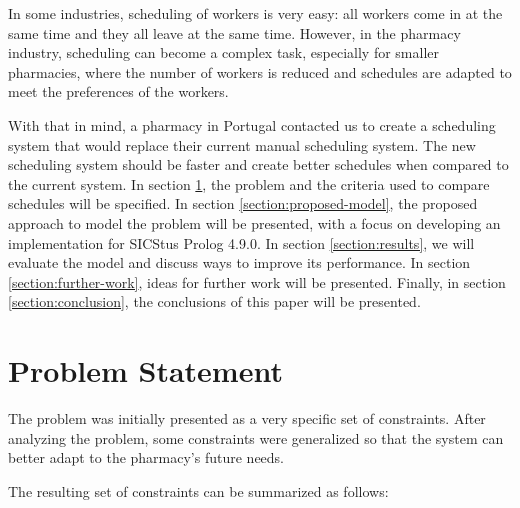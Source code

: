 \documentclass[conference]{IEEEtran}
\begin{document}
In some industries, scheduling of workers is very easy: all workers come in at the same time and they all leave at the same time.
However, in the pharmacy industry, scheduling can become a complex task, especially for smaller pharmacies, where the number of workers is reduced and schedules are adapted to meet the preferences of the workers.

With that in mind, a pharmacy in Portugal contacted us to create a scheduling system that would replace their current manual scheduling system. The new scheduling system should be faster and create better schedules when compared to the current system.
In section \ref{section:problem-statement}, the problem and the criteria used to compare schedules will be specified. In section \ref{section:proposed-model}, the proposed approach to model the problem will be presented, with a focus on developing an implementation for SICStus Prolog 4.9.0. In section \ref{section:results}, we will evaluate the model and discuss ways to improve its performance. In section \ref{section:further-work}, ideas for further work will be presented. Finally, in section \ref{section:conclusion}, the conclusions of this paper will be presented.

\section{Problem Statement}
\label{section:problem-statement}

The problem was initially presented as a very specific set of constraints.
After analyzing the problem, some constraints were generalized so that the system can better adapt to the pharmacy's future needs.

The resulting set of constraints can be summarized as follows:
\end{document}
